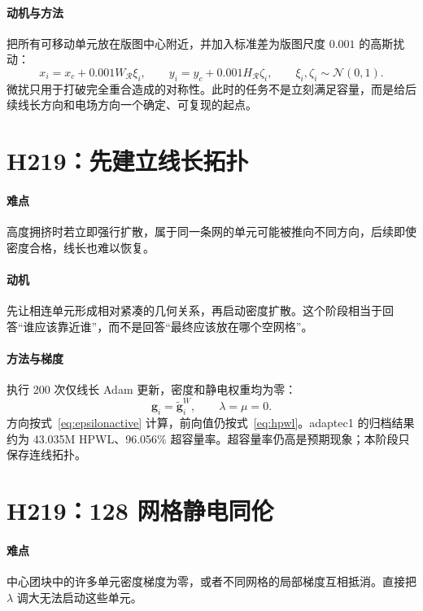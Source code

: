 \documentclass[UTF8,a4paper,11pt]{ctexrep}
\begin{document}
\paragraph{动机与方法}
把所有可移动单元放在版图中心附近，并加入标准差为版图尺度 $0.001$ 的高斯扰动：
\begin{equation}
 x_i=x_c+0.001W_{\mathcal R}\xi_i,\qquad
 y_i=y_c+0.001H_{\mathcal R}\zeta_i,
 \qquad \xi_i,\zeta_i\sim\mathcal N(0,1). \label{eq:init}
\end{equation}
微扰只用于打破完全重合造成的对称性。此时的任务不是立刻满足容量，而是给后续线长方向和电场方向一个确定、可复现的起点。

\section{H219：先建立线长拓扑}
\paragraph{难点}
高度拥挤时若立即强行扩散，属于同一条网的单元可能被推向不同方向，后续即使密度合格，线长也难以恢复。

\paragraph{动机}
先让相连单元形成相对紧凑的几何关系，再启动密度扩散。这个阶段相当于回答“谁应该靠近谁”，而不是回答“最终应该放在哪个空网格”。

\paragraph{方法与梯度}
执行 200 次仅线长 Adam 更新，密度和静电权重均为零：
\begin{equation}
 \bm g_i=\widetilde{\bm g}^W_i,
 \qquad \lambda=\mu=0. \label{eq:seedgrad}
\end{equation}
方向按式~\eqref{eq:epsilonactive} 计算，前向值仍按式~\eqref{eq:hpwl}。adaptec1 的归档结果约为 43.035M HPWL、96.056\% 超容量率。超容量率仍高是预期现象；本阶段只保存连线拓扑。

\section{H219：128 网格静电同伦}
\paragraph{难点}
中心团块中的许多单元密度梯度为零，或者不同网格的局部梯度互相抵消。直接把 $\lambda$ 调大无法启动这些单元。
\end{document}
